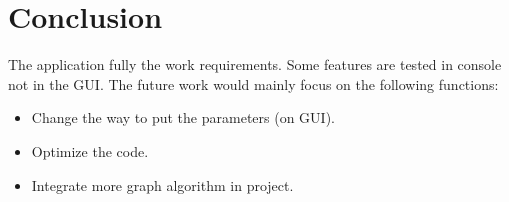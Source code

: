 \section{Conclusion}
The application fully the work requirements. Some features are tested in console not in the GUI. The future work would mainly focus on the following functions:
\begin{itemize}
\item Change the way to put the parameters (on GUI).
\item Optimize the code.
\item Integrate more graph algorithm in project.
\end{itemize}
